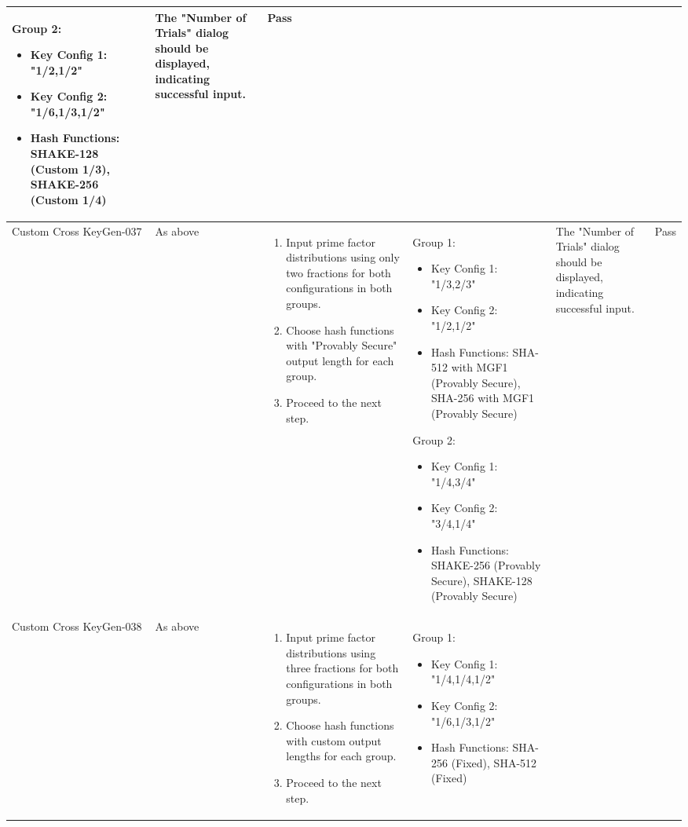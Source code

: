 \documentclass[]{final_report}
\theoremstyle{definition}
\begin{document}
\begin{longtable}{|p{1.5cm}|p{2.5cm}|p{3.5cm}|p{3.0cm}|p{3cm}|p{2cm}|}
Group 2:
\begin{itemize}
  \item Key Config 1: "1/2,1/2"
  \item Key Config 2: "1/6,1/3,1/2"
  \item Hash Functions: SHAKE-128 (Custom 1/3), SHAKE-256 (Custom 1/4)
\end{itemize}
 & The "Number of Trials" dialog should be displayed, indicating successful input. & Pass \\
  \hline
  Custom
  Cross
  KeyGen-037 & As above & 
  \begin{enumerate}
    \item Input prime factor distributions using only two fractions for both configurations in both groups.
    \item Choose hash functions with "Provably Secure" output length for each group.
    \item Proceed to the next step.
  \end{enumerate} & Group 1:
\begin{itemize}
  \item Key Config 1: "1/3,2/3"
  \item Key Config 2: "1/2,1/2"
  \item Hash Functions: SHA-512 with MGF1 (Provably Secure), SHA-256 with MGF1 (Provably Secure)
\end{itemize}

Group 2:
\begin{itemize}
  \item Key Config 1: "1/4,3/4"
  \item Key Config 2: "3/4,1/4"
  \item Hash Functions: SHAKE-256 (Provably Secure), SHAKE-128 (Provably Secure)
\end{itemize}  & 

The "Number of Trials" dialog should be displayed, indicating successful input.
 & Pass \\
 \hline
  Custom
  Cross
  KeyGen-038 & As above & 
  \begin{enumerate}
    \item Input prime factor distributions using three fractions for both configurations in both groups.
    \item Choose hash functions with custom output lengths for each group.
    \item Proceed to the next step.
  \end{enumerate} & Group 1:
\begin{itemize}
  \item Key Config 1: "1/4,1/4,1/2"
  \item Key Config 2: "1/6,1/3,1/2"
  \item Hash Functions: SHA-256 (Fixed), SHA-512 (Fixed)
\end{itemize}


\end{longtable}
\end{document}
